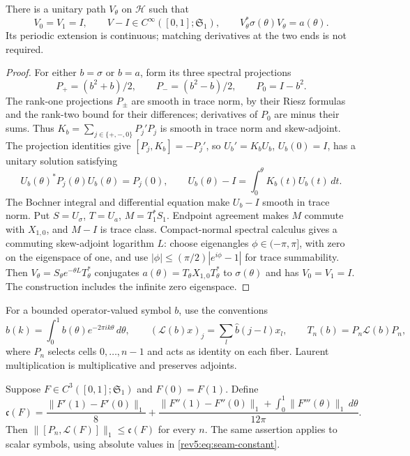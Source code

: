 \begin{lemma}\label{rev5:lem:gauge}
There is a unitary path $V_\theta$ on $\mathscr H$ such that
\begin{equation}\label{rev5:eq:gauge}
 V_0=V_1=I,\qquad
 V-I\in C^\infty([0,1];\mathfrak S_1),\qquad
 V_\theta^*\sigma(\theta)V_\theta=a(\theta).
\end{equation}
Its periodic extension is continuous; matching derivatives at the two
ends is not required.
\end{lemma}

\begin{proof}
For either $b=\sigma$ or $b=a$, form its three spectral projections
\[
 P_+=(b^2+b)/2,\qquad P_-=(b^2-b)/2,\qquad P_0=I-b^2.
\]
The rank-one projections $P_\pm$ are smooth in trace norm, by their
Riesz formulas and the rank-two bound for their differences; derivatives
of $P_0$ are minus their sums. Thus
$K_b=\sum_{j\in\{+,-,0\}}P_j'P_j$ is smooth in trace norm and
skew-adjoint. The projection identities give $[P_j,K_b]=-P_j'$,
so $U_b'=K_bU_b$, $U_b(0)=I$, has a unitary solution satisfying
\[
 U_b(\theta)^*P_j(\theta)U_b(\theta)=P_j(0),\qquad
 U_b(\theta)-I=\int_0^\theta K_b(t)U_b(t)\,dt.
\]
The Bochner integral and differential equation make $U_b-I$ smooth
in trace norm. Put $S=U_\sigma$, $T=U_a$, $M=T_1^*S_1$. Endpoint
agreement makes $M$ commute with $X_{1,0}$, and $M-I$ is trace class.
Compact-normal spectral calculus gives a commuting skew-adjoint
logarithm $L$: choose eigenangles $\phi\in(-\pi,\pi]$, with zero on
the eigenspace of one, and use
$|\phi|\le(\pi/2)|e^{i\phi}-1|$ for trace summability.
Then $V_\theta=S_\theta e^{-\theta L}T_\theta^*$ conjugates
$a(\theta)=T_\theta X_{1,0}T_\theta^*$ to $\sigma(\theta)$ and has
$V_0=V_1=I$. The construction includes the infinite zero eigenspace.
\end{proof}

For a bounded operator-valued symbol $b$, use the conventions
\begin{equation}\label{rev5:eq:laurent}
 \widehat b(k)=\int_0^1b(\theta)e^{-2\pi ik\theta}\,d\theta,
 \qquad (\mathcal L(b)x)_j=\sum_l\widehat b(j-l)x_l,
 \qquad T_n(b)=P_n\mathcal L(b)P_n,
\end{equation}
where $P_n$ selects cells $0,\ldots,n-1$ and acts as identity on each
fiber.  Laurent multiplication is multiplicative and preserves adjoints.

\begin{lemma}\label{rev5:lem:seam}
Suppose $F\in C^3([0,1];\mathfrak S_1)$ and $F(0)=F(1)$.  Define
\begin{equation}\label{rev5:eq:seam-constant}
 \mathfrak c(F)=\frac{\|F'(1)-F'(0)\|_1}{8}
 +\frac{\|F''(1)-F''(0)\|_1+
             \int_0^1\|F'''(\theta)\|_1\,d\theta}{12\pi}.
\end{equation}
Then $\|[P_n,\mathcal L(F)]\|_1\leq\mathfrak c(F)$ for every $n$.
The same assertion applies to scalar symbols, using absolute values
in \eqref{rev5:eq:seam-constant}.
\end{lemma}

